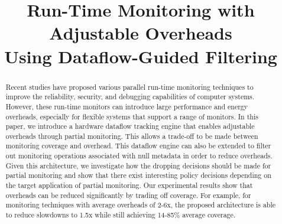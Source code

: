 \title{
Run-Time Monitoring with Adjustable Overheads \\Using Dataflow-Guided Filtering
}

{\author{
}
}

\maketitle

\thispagestyle{empty}

\begin{abstract}

Recent studies have proposed various parallel run-time monitoring techniques to
improve the reliability, security, and debugging capabilities of computer
systems. However, these run-time monitors can introduce large performance and energy
overheads, especially for flexible systems that support a range of monitors.
In this paper, we introduce a hardware dataflow tracking engine that enables
adjustable overheads through partial monitoring. This allows a trade-off to be
made between monitoring coverage and overhead. This dataflow engine
can also be extended to filter out monitoring operations associated with null
metadata in order to reduce overheads.
Given this architecture, we investigate how the dropping decisions should be
made for partial monitoring and show that there exist interesting policy
decisions depending on the target application of partial monitoring.
Our experimental results show that overheads can be reduced significantly 
by trading off coverage. For example, for monitoring techniques with average
overheads of 2-6x, the proposed architecture is able to reduce slowdowns to
1.5x while still achieving 14-85\% average coverage. 

\end{abstract}
